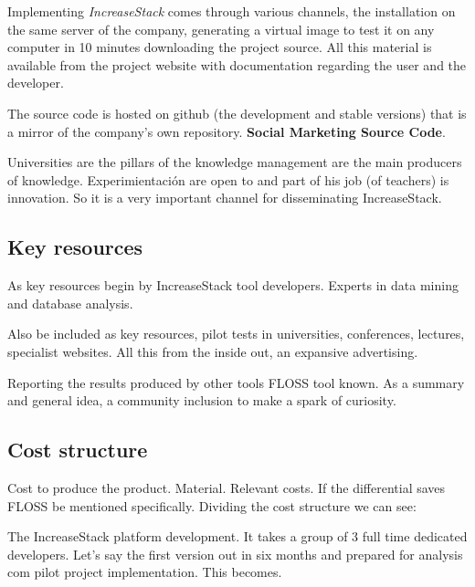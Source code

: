\documentclass[11pt]{scrartcl}
\begin{document}
\par Implementing \emph{IncreaseStack} comes through various channels, the installation on the same server of the company, generating a virtual image to test it on any computer in 10 minutes downloading the project source. All this material is available from the project website with documentation regarding the user and the developer.

\par The source code is hosted on github (the development and stable versions) that is a mirror of the company's own repository. \textbf{Social Marketing Source Code}.

\par Universities are the pillars of the knowledge management are the main producers of knowledge. Experimientación are open to and part of his job (of teachers) is innovation. So it is a very important channel for disseminating IncreaseStack.

\subsection{Key resources}

\par As key resources begin by IncreaseStack tool developers. Experts in data mining and database analysis.

\par Also be included as key resources, pilot tests in universities, conferences, lectures, specialist websites. All this from the inside out, an expansive advertising.
\par Reporting the results produced by other tools FLOSS tool known. As a summary and general idea, a community inclusion to make a spark of curiosity.
    
\subsection{Cost structure}

\par Cost to produce the product. Material. Relevant costs. If the differential saves FLOSS be mentioned specifically. Dividing the cost structure we can see:

\par The IncreaseStack platform development. It takes a group of 3 full time dedicated developers. Let's say the first version out in six months and prepared for analysis com pilot project implementation. This becomes.
\end{document}
